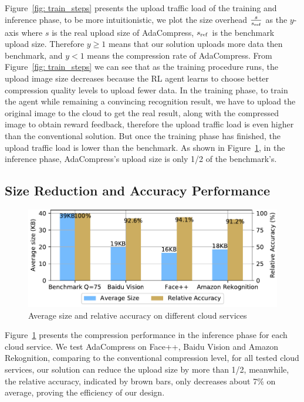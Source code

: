 Figure~\ref{fig: train_steps} presents the upload traffic load of the training and inference phase, to be more intuitionistic, we plot the size overhead $ \frac{s}{s_{\rm ref}} $ as the $ y $-axis where $ s $ is the real upload size of AdaCompress, $ s_{\rm ref} $ is the benchmark upload size. Therefore $ y \geq 1 $ means that our solution uploads more data then benchmark, and $ y < 1 $ means the compression rate of AdaCompress. From Figure~\ref{fig: train_steps} we can see that as the training procedure runs, the upload image size decreases because the RL agent learns to choose better compression quality levels to upload fewer data. In the training phase, to train the agent while remaining a convincing recognition result, we have to upload the original image to the cloud to get the real result, along with the compressed image to obtain reward feedback, therefore the upload traffic load is even higher than the conventional solution. But once the training phase has finished, the upload traffic load is lower than the benchmark. As shown in Figure~\ref{fig: compress_performance}, in the inference phase, AdaCompress's upload size is only 1/2 of the benchmark's. %

\subsection{Size Reduction and Accuracy Performance}

\begin{figure}[htbp]
    \includegraphics[width=\linewidth]{figures/compress-performance.pdf}
    \caption{Average size and relative accuracy on different cloud services}
    \label{fig: compress_performance}
\end{figure}

Figure~\ref{fig: compress_performance} presents the compression performance in the inference phase for each cloud service. We test AdaCompress on Face++, Baidu Vision and Amazon Rekognition, comparing to the conventional compression level, for all tested cloud services, our solution can reduce the upload size by more than 1/2, meanwhile, the relative accuracy, indicated by brown bars, only decreases about 7\% on average, proving the efficiency of our design. %


